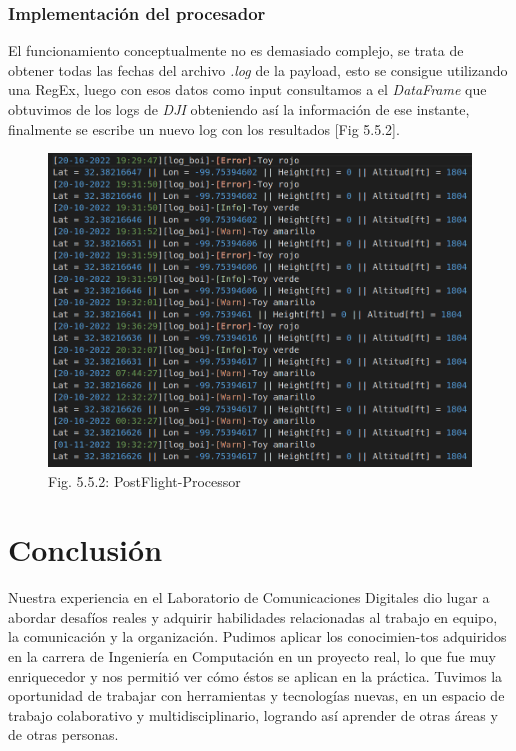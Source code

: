 \documentclass[12pt]{article}
\begin{document}
\subsubsection{Implementación del procesador}
El funcionamiento conceptualmente no es demasiado complejo, se trata de obtener todas las fechas del archivo \textit{.log} de la payload, esto se consigue utilizando una RegEx, luego con esos datos como input consultamos a el \textit{DataFrame} que obtuvimos de los logs de \textit{DJI} obteniendo así la información de ese instante, finalmente se escribe un nuevo log con los resultados [Fig 5.5.2].

\begin{figure}[ht]
  \centering
  \includegraphics[scale=0.4]{images/post-flight-processor.png}
  \caption{Fig. 5.5.2: PostFlight-Processor}
\end{figure}

\section{Conclusión}
Nuestra experiencia en el Laboratorio de Comunicaciones Digitales dio lugar a abordar desafíos reales y adquirir habilidades relacionadas al trabajo en equipo, la comunicación y la organización. Pudimos aplicar los conocimien-tos adquiridos en la carrera de Ingeniería en Computación en un proyecto real, lo que fue muy enriquecedor y nos permitió ver cómo éstos se aplican en la práctica. Tuvimos la oportunidad de trabajar con herramientas y tecnologías nuevas, en un espacio de trabajo colaborativo y multidisciplinario, logrando así aprender de otras áreas y de otras personas.
\end{document}
